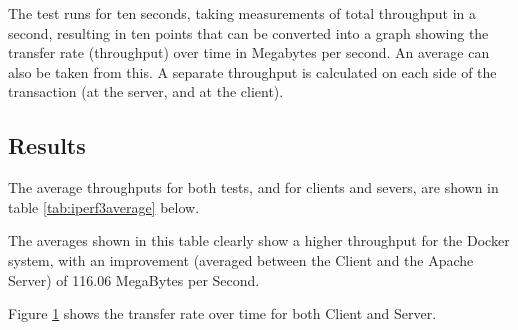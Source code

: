 The test runs for ten seconds, taking measurements of total throughput in a second, resulting in ten points that can be converted into a graph showing the transfer rate (throughput) over time in Megabytes per second. An average can also be taken from this. A separate throughput is calculated on each side of the transaction (at the server, and at the client).
 
\subsection{Results}
The average throughputs for both tests, and for clients and severs, are shown in table \ref{tab:iperf3average} below.

\begin{table}[h]
\centering
\caption{Table showing the average transfer rate in a 10 second period}
\label{tab:iperf3average}
\end{table}

The averages shown in this table clearly show a higher throughput for the Docker system, with an improvement (averaged between the Client and the Apache Server) of 116.06 MegaBytes per Second.

Figure \ref{fig:test1graphs} shows the transfer rate over time for both Client and Server.

\begin{figure}[H]
\caption{}
\label{fig:test1graphs}
\centering
\end{figure}

